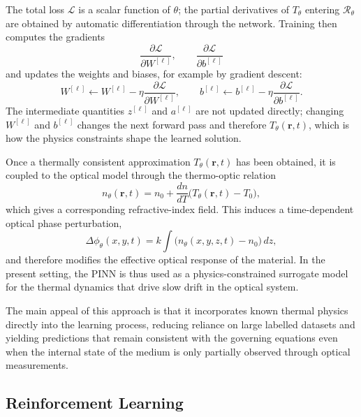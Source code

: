 \documentclass[11pt,letterpaper]{article}
\begin{document}
The total loss $\mathcal{L}$ is a scalar function of $\theta$; the partial derivatives of
$T_\theta$ entering $\mathcal{R}_\theta$ are obtained by automatic differentiation through
the network. Training then computes the gradients
\begin{equation}
\frac{\partial \mathcal{L}}{\partial W^{[\ell]}},
\qquad
\frac{\partial \mathcal{L}}{\partial b^{[\ell]}}
\end{equation}
and updates the weights and biases, for example by gradient descent:
\begin{equation}
W^{[\ell]} \leftarrow W^{[\ell]} - \eta \frac{\partial \mathcal{L}}{\partial W^{[\ell]}},
\qquad
b^{[\ell]} \leftarrow b^{[\ell]} - \eta \frac{\partial \mathcal{L}}{\partial b^{[\ell]}}.
\end{equation}
The intermediate quantities $z^{[\ell]}$ and $a^{[\ell]}$ are not updated directly; changing
$W^{[\ell]}$ and $b^{[\ell]}$ changes the next forward pass and therefore $T_\theta(\mathbf{r},t)$,
which is how the physics constraints shape the learned solution.

Once a thermally consistent approximation $T_\theta(\mathbf{r},t)$ has been obtained, it is
coupled to the optical model through the thermo-optic relation
\begin{equation}
n_\theta(\mathbf{r},t)
=
n_0+\frac{dn}{dT}\bigl(T_\theta(\mathbf{r},t)-T_0\bigr),
\end{equation}
which gives a corresponding refractive-index field. This induces a time-dependent optical phase
perturbation,
\begin{equation}
\Delta \phi_\theta(x,y,t)
=
k\int \bigl(n_\theta(x,y,z,t)-n_0\bigr)\,dz,
\end{equation}
and therefore modifies the effective optical response of the material. In the present setting, the
PINN is thus used as a physics-constrained surrogate model for the thermal dynamics that drive
slow drift in the optical system.

The main appeal of this approach is that it incorporates known thermal physics directly into
the learning process, reducing reliance on large labelled datasets and yielding predictions
that remain consistent with the governing equations even when the internal state of the medium
is only partially observed through optical measurements.

\subsection{Reinforcement Learning}
\end{document}
